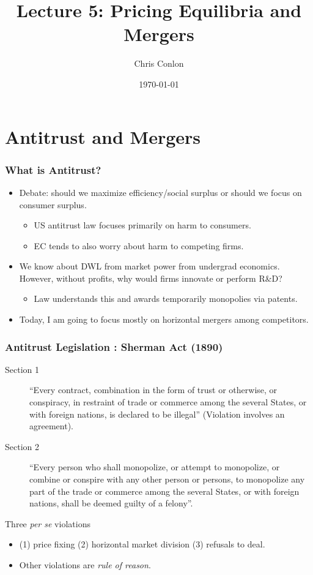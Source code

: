 \documentclass[xcolor=pdftex,dvipsnames,table,mathserif]{beamer}
\begin{document}
\title{Lecture 5: Pricing Equilibria and Mergers}
\author{Chris Conlon}
\date{\today}

\frame{\titlepage}

\section{Antitrust and Mergers}

\begin{frame}
\frametitle{What is Antitrust?}
 \begin{itemize}
\item Debate: should we maximize \alert{efficiency/social surplus} or should we focus on \alert{consumer surplus}.
\begin{itemize}
\item US antitrust law focuses primarily on harm to consumers.
\item EC tends to also worry about harm to competing firms.
 \end{itemize}
 \item We know about DWL from market power from undergrad economics. However, without profits, why would firms innovate or perform R\&D?
 \begin{itemize}
\item Law understands this and awards temporarily monopolies via patents.
 \end{itemize}
\item Today, I am going to focus mostly on \alert{horizontal mergers} among competitors.
 \end{itemize}
\end{frame}

\begin{frame}
\frametitle{Antitrust Legislation : Sherman Act (1890)}
 \begin{description}
\item [Section 1]``Every contract, combination in the form of trust or otherwise, or conspiracy, in restraint of trade or commerce among the several States, or with foreign nations, is declared to be illegal'' (Violation involves an \alert{agreement}).
\item [Section 2] ``Every person who shall monopolize, or attempt to monopolize, or combine or conspire with any other person or persons, to monopolize any part of the trade or commerce among the several States, or with foreign nations, shall be deemed guilty of a felony''.
 \end{description}
 Three \textit{per se} violations
 \begin{itemize}
 \item (1) price fixing (2) horizontal market division (3) refusals to deal.
 \item Other violations are \textit{rule of reason}.
 \end{itemize}
 
\end{frame}
\end{document}
